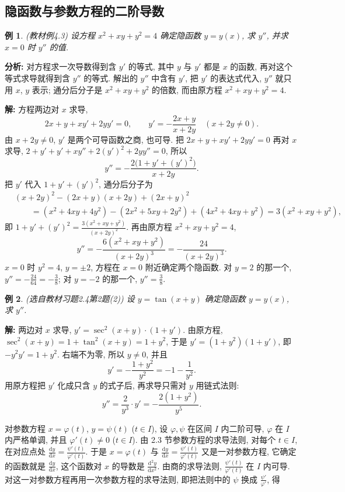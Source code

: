 \documentclass[UTF8,openany]{ctexbook}
\theoremstyle{chinesetextbook}
\newtheorem{example}{例}[section]
\newenvironment{cnsolution}{\par\indent\textbf{解:} \ignorespaces}{\par}
\newcommand{\dd}{\mathrm d}
\begin{document}
\subsection{隐函数与参数方程的二阶导数}
\begin{example}\label{ex:c2-4-3}
\textnormal{(教材例4.3)} 设方程 $x^2+xy+y^2=4$ 确定隐函数 $y=y(x)$, 求 $y''$, 并求 $x=0$ 时 $y''$ 的值.
\end{example}
\par\indent\textbf{分析:} 对方程求一次导数得到含 $y'$ 的等式, 其中 $y$ 与 $y'$ 都是 $x$ 的函数, 再对这个等式求导就得到含 $y''$ 的等式. 解出的 $y''$ 中含有 $y'$, 把 $y'$ 的表达式代入, $y''$ 就只用 $x$, $y$ 表示; 通分后分子是 $x^2+xy+y^2$ 的倍数, 而由原方程 $x^2+xy+y^2=4$.
\begin{cnsolution}
方程两边对 $x$ 求导,
\[
2x+y+xy'+2yy'=0,\qquad y'=-\frac{2x+y}{x+2y}\quad(x+2y\ne0).
\]
由 $x+2y\ne0$, $y'$ 是两个可导函数之商, 也可导. 把 $2x+y+xy'+2yy'=0$ 再对 $x$ 求导, $2+y'+y'+xy''+2(y')^2+2yy''=0$, 所以
\[
y''=-\frac{2\bigl(1+y'+(y')^2\bigr)}{x+2y}.
\]
把 $y'$ 代入 $1+y'+(y')^2$, 通分后分子为
\[
\begin{aligned}
&(x+2y)^2-(2x+y)(x+2y)+(2x+y)^2\\
&\qquad=(x^2+4xy+4y^2)-(2x^2+5xy+2y^2)+(4x^2+4xy+y^2)=3(x^2+xy+y^2),
\end{aligned}
\]
即 $\displaystyle1+y'+(y')^2=\frac{3(x^2+xy+y^2)}{(x+2y)^2}$. 再由原方程 $x^2+xy+y^2=4$,
\[
y''=-\frac{6(x^2+xy+y^2)}{(x+2y)^3}=-\frac{24}{(x+2y)^3}.
\]
$x=0$ 时 $y^2=4$, $y=\pm2$, 方程在 $x=0$ 附近确定两个隐函数. 对 $y=2$ 的那一个, $\displaystyle y''=-\frac{24}{64}=-\frac38$; 对 $y=-2$ 的那一个, $\displaystyle y''=\frac38$.
\end{cnsolution}
\begin{example}\label{ex:c2-h4-2}
\textnormal{(选自教材习题2.4第2题(2))} 设 $y=\tan(x+y)$ 确定隐函数 $y=y(x)$, 求 $y''$.
\end{example}
\begin{cnsolution}
两边对 $x$ 求导, $y'=\sec^2(x+y)\cdot(1+y')$. 由原方程, $\sec^2(x+y)=1+\tan^2(x+y)=1+y^2$, 于是 $y'=(1+y^2)(1+y')$, 即 $-y^2y'=1+y^2$. 右端不为零, 所以 $y\ne0$, 并且
\[
y'=-\frac{1+y^2}{y^2}=-1-\frac1{y^2}.
\]
用原方程把 $y'$ 化成只含 $y$ 的式子后, 再求导只需对 $y$ 用链式法则:
\[
y''=\frac2{y^3}\cdot y'=-\frac{2(1+y^2)}{y^5}.
\]
\end{cnsolution}
对参数方程 $x=\varphi(t)$, $y=\psi(t)$ ($t\in I$), 设 $\varphi,\psi$ 在区间 $I$ 内二阶可导, $\varphi$ 在 $I$ 内严格单调, 并且 $\varphi'(t)\ne0$ ($t\in I$). 由 2.3 节参数方程的求导法则, 对每个 $t\in I$, 在对应点处 $\displaystyle\frac{\dd y}{\dd x}=\frac{\psi'(t)}{\varphi'(t)}$. 于是 $x=\varphi(t)$ 与 $\displaystyle\frac{\dd y}{\dd x}=\frac{\psi'(t)}{\varphi'(t)}$ 又是一对参数方程, 它确定的函数就是 $\displaystyle\frac{\dd y}{\dd x}$, 这个函数对 $x$ 的导数是 $\displaystyle\frac{\dd^2y}{\dd x^2}$. 由商的求导法则, $\displaystyle\frac{\psi'(t)}{\varphi'(t)}$ 在 $I$ 内可导. 对这一对参数方程再用一次参数方程的求导法则, 即把法则中的 $\psi$ 换成 $\displaystyle\frac{\psi'}{\varphi'}$, 得
\end{document}
